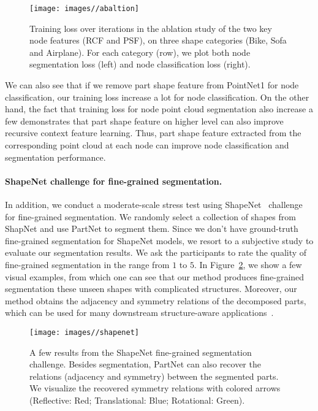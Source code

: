 \begin{figure}[t]
  \centering
  \texttt{[image: images//abaltion]}
  \caption{Training loss over iterations in the ablation study of the two key node features (RCF and PSF), on three shape categories (Bike, Sofa and Airplane). For each category (row), we plot both node segmentation loss (left) and node classification loss (right).}
  \label{abalation_figure}
\end{figure}

We can also see that if we remove part shape feature from PointNet1 for node classification, our training loss increase a lot for node classification. On the other hand, the fact that training loss for node point cloud segmentation also increase a few demonstrates that part shape feature on higher level can also improve recursive context feature learning. Thus, part shape feature extracted from the corresponding point cloud at each node can improve node classification and segmentation performance.
\fi





\paragraph{ShapeNet challenge for fine-grained segmentation.}
In addition, we conduct a moderate-scale stress test using ShapeNet~\cite{Shapenet} challenge for fine-grained segmentation. We randomly select a collection of shapes from ShapNet and use PartNet to segment them.
Since we don't have ground-truth fine-grained segmentation for ShapeNet models, we resort to a subjective study to evaluate our segmentation results. We ask the participants to rate the quality of fine-grained segmentation in the range from $1$ to $5$.   In Figure~\ref{shapenet}, we show a few visual examples, from which one can see that our method produces fine-grained segmentation these unseen shapes with complicated structures. Moreover, our method obtains the adjacency and symmetry relations of the decomposed parts, which can be used for many downstream structure-aware applications~\cite{mitra2013structure}.




\begin{figure}[t]
  \centering
  \texttt{[image: images//shapenet]}
  \caption{A few results from the ShapeNet fine-grained segmentation challenge. Besides segmentation, PartNet can also recover the relations (adjacency and symmetry) between the segmented parts. We visualize the recovered symmetry relations with colored arrows (Reflective: Red; Translational: Blue; Rotational: Green).}
  \label{shapenet}\vspace{-8pt}
\end{figure}


